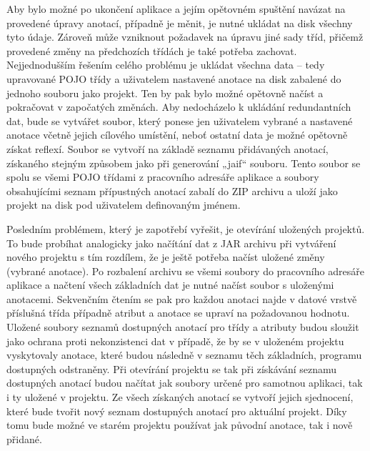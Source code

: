 \documentclass{projekt}
\begin{document}
Aby bylo možné po ukončení aplikace a jejím opětovném spuštění navázat na provedené úpravy anotací, případně je měnit, je nutné ukládat na disk všechny tyto údaje. Zároveň může vzniknout požadavek na úpravu jiné sady tříd, přičemž provedené změny na předchozích třídách je také potřeba zachovat. Nejjednodušším řešením celého problému je ukládat všechna data – tedy upravované POJO třídy a uživatelem nastavené anotace na disk zabalené do jednoho souboru jako projekt. Ten by pak bylo možné opětovně načíst a pokračovat v  započatých změnách. Aby nedocházelo k ukládání redundantních dat, bude se vytvářet soubor, který ponese jen uživatelem vybrané a nastavené anotace včetně jejich cílového umístění, neboť ostatní data je možné opětovně získat reflexí. Soubor se vytvoří na základě seznamu přidávaných anotací, získaného stejným způsobem jako při generování „jaif“ souboru. Tento soubor se spolu se všemi POJO třídami z pracovního adresáře aplikace a soubory obsahujícími seznam přípustných anotací zabalí do ZIP archivu a uloží jako projekt na disk pod uživatelem definovaným jménem.


Posledním problémem, který je zapotřebí vyřešit, je otevírání uložených projektů. To bude probíhat analogicky jako načítání dat z JAR archivu při vytváření nového projektu s tím rozdílem, že je ještě potřeba načíst uložené změny (vybrané anotace). Po rozbalení archivu se všemi soubory do pracovního adresáře aplikace a načtení všech základních dat je nutné načíst soubor s uloženými anotacemi. Sekvenčním čtením se pak pro každou anotaci najde v datové vrstvě příslušná třída případně atribut a anotace se upraví na požadovanou hodnotu. Uložené soubory seznamů dostupných anotací pro třídy a atributy budou sloužit jako ochrana proti nekonzistenci dat v případě, že by se v uloženém projektu vyskytovaly anotace, které budou následně v seznamu těch základních, programu dostupných odstraněny. Při otevírání projektu se tak při získávání seznamu dostupných anotací budou načítat jak soubory určené pro samotnou aplikaci, tak i ty uložené v projektu. Ze všech získaných anotací se vytvoří jejich sjednocení, které bude tvořit nový seznam dostupných anotací pro aktuální projekt. Díky tomu bude možné ve starém projektu používat jak původní anotace, tak i nově přidané. 
\end{document}

